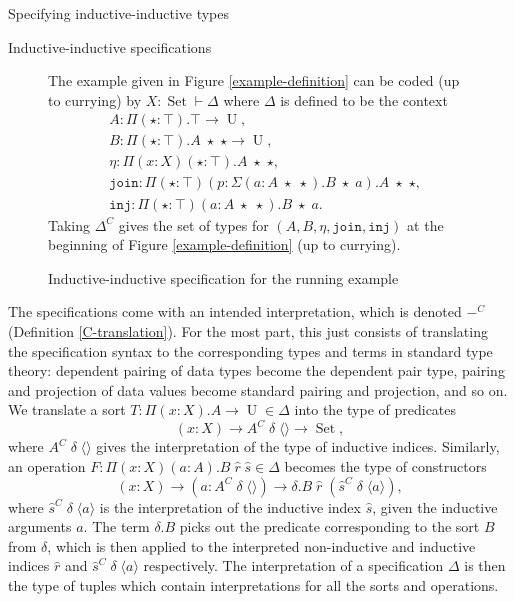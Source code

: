 \documentclass[acmsmall,review]{acmart}\settopmatter{printfolios=true,printccs=false,printacmref=false}
\DeclareMathOperator{\USet}{Set}
\DeclareMathOperator{\UU}{U}
\newcommand{\tac}{\vdash}
\newcommand{\join}{\texttt{join}}
\newcommand{\inj}{\texttt{inj}}
\def\emptytuple{\langle\rangle}
\begin{document}
\begin{section}{Specifying inductive-inductive types}
\begin{subsection}{Inductive-inductive specifications}
\begin{figure}[htpb]\begin{flushleft}
    The example given in Figure \ref{example-definition} can be coded (up to currying) by $X : \USet \tac \Delta$ where $\Delta$ is defined to be the context \begin{align*}& A : \Pi(\star : \top).\top \to \UU,\\& B : \Pi(\star : \top).A\;\star\;\star \to \UU,\\& \eta : \Pi(x : X)(\star : \top).A\;\star\;\star, \\&\join : \Pi(\star : \top)(p : \Sigma(a : A\;\star\;\star).B\;\star\;a).A\;\star\;\star,\\& \inj : \Pi(\star : \top)(a : A\;\star\;\star).B\;\star\;a.\end{align*}
    Taking $\Delta^C$ gives the set of types for $(A, B, \eta, \join, \inj)$ at the beginning of Figure \ref{example-definition} (up to currying).
    
    \caption{\label{example-code}Inductive-inductive specification for the running example}
\end{flushleft}\end{figure}

The specifications come with an intended interpretation, which is denoted $-^C$ (Definition \ref{C-translation}).
For the most part, this just consists of translating the specification syntax to the corresponding types and terms in standard type theory: dependent pairing of data types become the dependent pair type, pairing and projection of data values become standard pairing and projection, and so on.
We translate a sort $T : \Pi(x : X).A \to \UU \in \Delta$ into the type of predicates \[(x : X) \to A^C\;\delta\;\emptytuple \to \USet,\] where $A^C\;\delta\;\emptytuple$ gives the interpretation of the type of inductive indices. Similarly, an operation $F : \Pi(x : X)(a : A).B\;\hat{r}\;\hat{s} \in \Delta$ becomes the type of constructors \[(x : X) \to (a : A^C\;\delta\;\emptytuple) \to \delta.B\;\hat{r}\;(\hat{s}^C\;\delta\;\langle a \rangle),\] where $\hat{s}^C\;\delta\;\langle a\rangle$ is the interpretation of the inductive index $\hat{s}$, given the inductive arguments $a$. The term $\delta.B$ picks out the predicate corresponding to the sort $B$ from $\delta$, which is then applied to the interpreted non-inductive and inductive indices $\hat{r}$ and $\hat{s}^C\;\delta\;\langle a \rangle$ respectively. The interpretation of a specification $\Delta$ is then the type of tuples which contain interpretations for all the sorts and operations.


\end{subsection}
\end{section}
\end{document}
